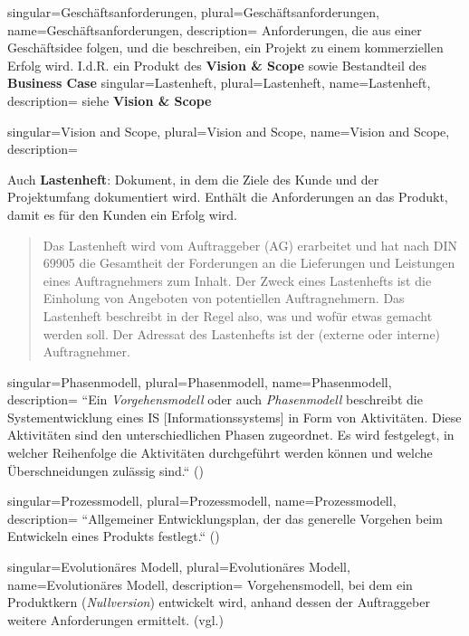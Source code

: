 {
singular={Geschäftsanforderungen},
plural={Geschäftsanforderungen},
name={Geschäftsanforderungen},
description={
Anforderungen, die aus einer Geschäftsidee folgen, und die beschreiben, ein Projekt zu einem kommerziellen Erfolg wird. I.d.R. ein Produkt des \textbf{Vision \& Scope} sowie Bestandteil des \textbf{Business Case}
}
}
{
singular={Lastenheft},
plural={Lastenheft},
name={Lastenheft},
description={
siehe \textbf{Vision \& Scope}
}
}


{
singular={Vision and Scope},
plural={Vision and Scope},
name={Vision and Scope},
description={
Auch \textbf{Lastenheft}: Dokument, in dem die Ziele des Kunde und der Projektumfang dokumentiert wird. Enthält die Anforderungen an das Produkt, damit es für den Kunden ein Erfolg wird.\\
\blockquote[{\cite[305]{AABG14m}}]{
Das Lastenheft wird vom Auftraggeber (AG) erarbeitet und hat
nach DIN 69905 die Gesamtheit der Forderungen an die Lieferungen und Leistungen eines Auftragnehmers zum Inhalt. Der Zweck eines Lastenhefts ist die Einholung von Angeboten von potentiellen Auftragnehmern. Das Lastenheft beschreibt
in der Regel also, was und wofür etwas gemacht werden soll. Der Adressat des
Lastenhefts ist der (externe oder interne) Auftragnehmer.
}


}
}


{
singular={Phasenmodell},
plural={Phasenmodell},
name={Phasenmodell},
description={
``Ein \textit{Vorgehensmodell} oder auch \textit{Phasenmodell} beschreibt die Systementwicklung
eines IS [Informationssystems] in Form von Aktivitäten. Diese Aktivitäten sind den unterschiedlichen
Phasen zugeordnet. Es wird festgelegt, in welcher Reihenfolge die Aktivitäten
durchgeführt werden können und welche Überschneidungen zulässig sind.`` (\cite[316]{AABG14n})
}
}

{
singular={Prozessmodell},
plural={Prozessmodell},
name={Prozessmodell},
description={
``Allgemeiner Entwicklungsplan, der das generelle Vorgehen beim Entwickeln eines Produkts festlegt.`` (\cite[694]{Bal08})
}
}

{
singular={Evolutionäres Modell},
plural={Evolutionäres Modell},
name={Evolutionäres Modell},
description={
Vorgehensmodell, bei dem ein Produktkern (\textit{Nullversion}) entwickelt wird, anhand dessen der Auftraggeber weitere Anforderungen ermittelt. (vgl.\cite[529 f.]{Bal08})
}
}

